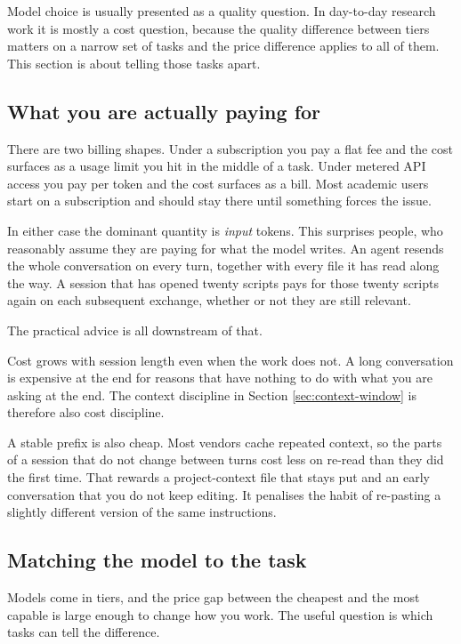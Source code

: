 \documentclass[11pt,a4paper]{article}
\begin{document}
Model choice is usually presented as a quality question. In day-to-day research
work it is mostly a cost question, because the quality difference between tiers
matters on a narrow set of tasks and the price difference applies to all of them.
This section is about telling those tasks apart.

\subsection{What you are actually paying for}

There are two billing shapes. Under a subscription you pay a flat fee and the
cost surfaces as a usage limit you hit in the middle of a task. Under metered API
access you pay per token and the cost surfaces as a bill. Most academic users
start on a subscription and should stay there until something forces the issue.

In either case the dominant quantity is \emph{input} tokens. This surprises
people, who reasonably assume they are paying for what the model writes. An agent
resends the whole conversation on every turn, together with every file it has
read along the way. A session that has opened twenty scripts pays for those
twenty scripts again on each subsequent exchange, whether or not they are still
relevant.

The practical advice is all downstream of that.

Cost grows with session length even when the work does not.
A long conversation is expensive at the end for reasons that have nothing to do
with what you are asking at the end. The context discipline in
Section \ref{sec:context-window} is therefore also cost discipline.

A stable prefix is also cheap. Most vendors cache repeated context,
so the parts of a session that do not change between turns cost less on re-read
than they did the first time. That rewards a project-context file that stays put
and an early conversation that you do not keep editing. It penalises the habit of
re-pasting a slightly different version of the same instructions.

\subsection{Matching the model to the task}

Models come in tiers, and the price gap between the cheapest and the most capable
is large enough to change how you work. The useful question is which tasks can
tell the difference.
\end{document}
